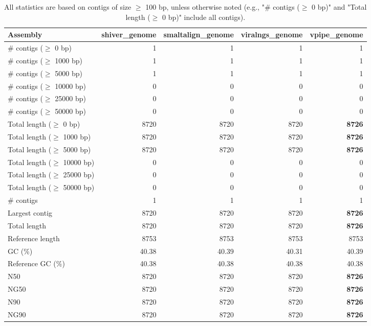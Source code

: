 \documentclass[12pt,a4paper]{article}
\begin{document}
\begin{table}[ht]
\begin{center}
\caption{All statistics are based on contigs of size $\geq$ 100 bp, unless otherwise noted (e.g., "\# contigs ($\geq$ 0 bp)" and "Total length ($\geq$ 0 bp)" include all contigs).}
\begin{tabular}{|l*{4}{|r}|}
\hline
Assembly & shiver\_genome & smaltalign\_genome & viralngs\_genome & vpipe\_genome \\ \hline
\# contigs ($\geq$ 0 bp) & 1 & 1 & 1 & 1 \\ \hline
\# contigs ($\geq$ 1000 bp) & 1 & 1 & 1 & 1 \\ \hline
\# contigs ($\geq$ 5000 bp) & 1 & 1 & 1 & 1 \\ \hline
\# contigs ($\geq$ 10000 bp) & 0 & 0 & 0 & 0 \\ \hline
\# contigs ($\geq$ 25000 bp) & 0 & 0 & 0 & 0 \\ \hline
\# contigs ($\geq$ 50000 bp) & 0 & 0 & 0 & 0 \\ \hline
Total length ($\geq$ 0 bp) & 8720 & 8720 & 8720 & {\bf 8726} \\ \hline
Total length ($\geq$ 1000 bp) & 8720 & 8720 & 8720 & {\bf 8726} \\ \hline
Total length ($\geq$ 5000 bp) & 8720 & 8720 & 8720 & {\bf 8726} \\ \hline
Total length ($\geq$ 10000 bp) & 0 & 0 & 0 & 0 \\ \hline
Total length ($\geq$ 25000 bp) & 0 & 0 & 0 & 0 \\ \hline
Total length ($\geq$ 50000 bp) & 0 & 0 & 0 & 0 \\ \hline
\# contigs & 1 & 1 & 1 & 1 \\ \hline
Largest contig & 8720 & 8720 & 8720 & {\bf 8726} \\ \hline
Total length & 8720 & 8720 & 8720 & {\bf 8726} \\ \hline
Reference length & 8753 & 8753 & 8753 & 8753 \\ \hline
GC (\%) & 40.38 & 40.39 & 40.31 & 40.39 \\ \hline
Reference GC (\%) & 40.38 & 40.38 & 40.38 & 40.38 \\ \hline
N50 & 8720 & 8720 & 8720 & {\bf 8726} \\ \hline
NG50 & 8720 & 8720 & 8720 & {\bf 8726} \\ \hline
N90 & 8720 & 8720 & 8720 & {\bf 8726} \\ \hline
NG90 & 8720 & 8720 & 8720 & {\bf 8726} \\ \hline

\end{tabular}
\end{center}
\end{table}
\end{document}
